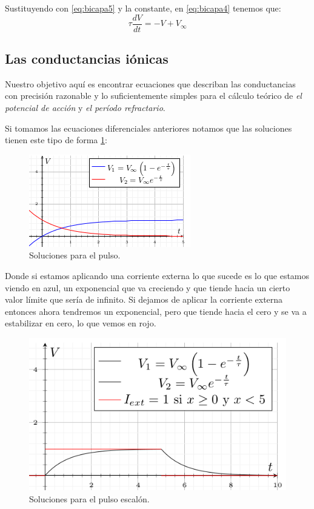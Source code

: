 Sustituyendo con \ref{eq:bicapa5} y la constante, en \ref{eq:bicapa4} tenemos que:
\begin{equation}
 \tau\dfrac{dV}{dt} = -V + V_{\infty}
 \label{eq:bicapa6}
\end{equation}

\subsection{Las conductancias iónicas}
Nuestro objetivo aquí es encontrar ecuaciones que describan las conductancias con precisión razonable y lo suficientemente simples para el cálculo teórico de \emph{el potencial de acción} y \emph{el período refractario}. 

Si tomamos las ecuaciones diferenciales anteriores notamos que las soluciones tienen este tipo de forma \ref{fig:graficaX}:

\begin{figure}[h]
 \centering
 \includegraphics[scale=0.8]{../Figuras/solPulso1.png}
 \caption{Soluciones para el pulso.}
 \label{fig:graficaX}
\end{figure}


Donde si estamos aplicando una corriente externa lo que sucede es lo que estamos viendo en azul, un exponencial que va creciendo y que tiende hacia un cierto valor límite que sería de infinito. Si dejamos de aplicar la corriente externa entonces ahora tendremos un exponencial, pero que tiende hacia el cero y se va a estabilizar en cero, lo que vemos en rojo. 

\begin{figure}[h]
 \centering
 \includegraphics[scale=0.5]{../Figuras/solPulso2.png}
 \caption{Soluciones para el pulso escalón.}
 \label{fig:graficaX1}
\end{figure}

